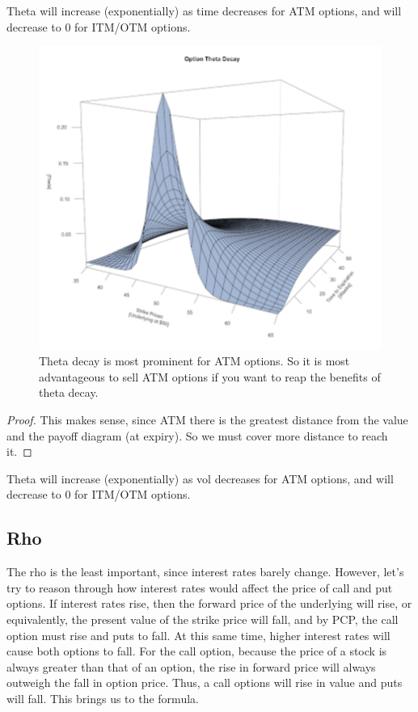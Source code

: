 \documentclass{article}
\begin{document}
    \begin{theorem}
      Theta will increase (exponentially) as time decreases for ATM options, and will decrease to $0$ for ITM/OTM options. 
      \begin{figure}[H]
        \centering 
        \includegraphics[scale=0.4]{img/theta_wrt_time.png}
        \caption{Theta decay is most prominent for ATM options. So it is most advantageous to sell ATM options if you want to reap the benefits of theta decay. } 
        \label{fig:theta_wrt_time}
      \end{figure}
    \end{theorem}
    \begin{proof}
      This makes sense, since ATM there is the greatest distance from the value and the payoff diagram (at expiry). So we must cover more distance to reach it. 
    \end{proof}

    \begin{theorem}
      Theta will increase (exponentially) as vol decreases for ATM options, and will decrease to $0$ for ITM/OTM options. 
    \end{theorem}

  \subsection{Rho}

    The rho is the least important, since interest rates barely change. However, let's try to reason through how interest rates would affect the price of call and put options. If interest rates rise, then the forward price of the underlying will rise, or equivalently, the present value of the strike price will fall, and by PCP, the call option must rise and puts to fall. At this same time, higher interest rates will cause both options to fall. For the call option, because the price of a stock is always greater than that of an option, the rise in forward price will always outweigh the fall in option price. Thus, a call options will rise in value and puts will fall. This brings us to the formula. 
\end{document}
